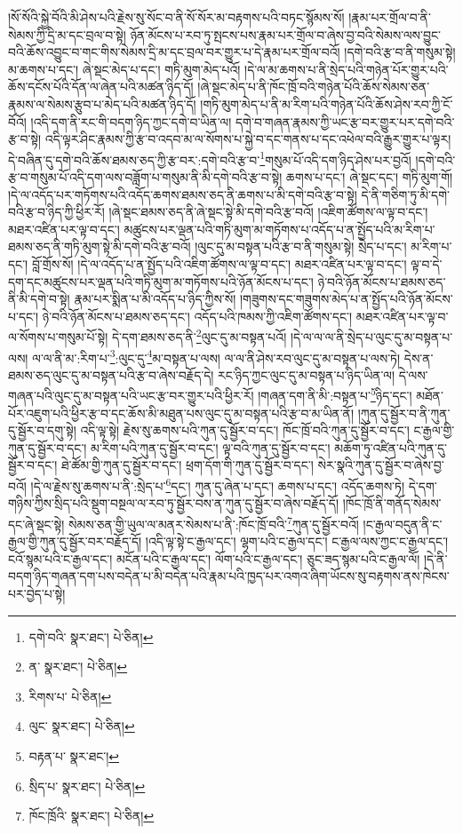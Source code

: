 །སོ་སོའི་སྐྱེ་བོའི་མི་ཤེས་པའི་རྗེས་སུ་སོང་བ་ནི་སོ་སོར་མ་བརྟགས་པའི་བཏང་སྙོམས་སོ། །རྣམ་པར་གྲོལ་བ་ནི་སེམས་ཀྱི་དྲི་མ་དང་བྲལ་བ་སྟེ། ཉོན་མོངས་པ་རབ་ཏུ་སྤངས་པས་རྣམ་པར་གྲོལ་བ་ཞེས་བྱ་བའི་སེམས་ལས་བྱུང་བའི་ཆོས་འབྱུང་བ་གང་གིས་སེམས་དྲི་མ་དང་བྲལ་བར་གྱུར་པ་དེ་རྣམ་པར་གྲོལ་བའོ། །དགེ་བའི་རྩ་བ་ནི་གསུམ་སྟེ། མ་ཆགས་པ་དང་། ཞེ་སྡང་མེད་པ་དང་། གཏི་མུག་མེད་པའོ། །དེ་ལ་མ་ཆགས་པ་ནི་སྲེད་པའི་གཉེན་པོར་གྱུར་པའི་ཆོས་དངོས་པོའི་དོན་ལ་ཞེན་པའི་མཚན་ཉིད་དོ། །ཞེ་སྡང་མེད་པ་ནི་ཁོང་ཁྲོ་བའི་གཉེན་པོའི་ཆོས་སེམས་ཅན་རྣམས་ལ་སེམས་རྩུབ་པ་མེད་པའི་མཚན་ཉིད་དོ། །གཏི་མུག་མེད་པ་ནི་མ་རིག་པའི་གཉེན་པོའི་ཆོས་ཤེས་རབ་ཀྱི་ངོ་བོའོ། །འདི་དག་ནི་རང་གི་བདག་ཉིད་ཀྱང་དགེ་བ་ཡིན་ལ། དགེ་བ་གཞན་རྣམས་ཀྱི་ཡང་རྩ་བར་གྱུར་པར་དགེ་བའི་རྩ་བ་སྟེ། འདི་ལྟར་ཤིང་རྣམས་ཀྱི་རྩ་བ་འདབ་མ་ལ་སོགས་པ་སྐྱེ་བ་དང་གནས་པ་དང་འཕེལ་བའི་རྒྱུར་གྱུར་པ་ལྟར། དེ་བཞིན་དུ་དགེ་བའི་ཆོས་ཐམས་ཅད་ཀྱི་རྩ་བར་:དགེ་བའི་རྩ་བ་\footnote{དགེ་བའི་  སྣར་ཐང་།  པེ་ཅིན། }གསུམ་པོ་འདི་དག་ཉིད་ཤེས་པར་བྱའོ། །དགེ་བའི་རྩ་བ་གསུམ་པོ་འདི་དག་ལས་བཟློག་པ་གསུམ་ནི་མི་དགེ་བའི་རྩ་བ་སྟེ། ཆགས་པ་དང་། ཞེ་སྡང་དང་། གཏི་མུག་གོ། །དེ་ལ་འདོད་པར་གཏོགས་པའི་འདོད་ཆགས་ཐམས་ཅད་ནི་ཆགས་པ་མི་དགེ་བའི་རྩ་བ་སྟེ། དེ་ནི་གཅིག་ཏུ་མི་དགེ་བའི་རྩ་བ་ཉིད་ཀྱི་ཕྱིར་རོ། །ཞེ་སྡང་ཐམས་ཅད་ནི་ཞེ་སྡང་སྟེ་མི་དགེ་བའི་རྩ་བའོ། །འཇིག་ཚོགས་ལ་ལྟ་བ་དང་། མཐར་འཛིན་པར་ལྟ་བ་དང་། མཚུངས་པར་ལྡན་པའི་གཏི་མུག་མ་གཏོགས་པ་འདོད་པ་ན་སྤྱོད་པའི་མ་རིག་པ་ཐམས་ཅད་ནི་གཏི་མུག་སྟེ་མི་དགེ་བའི་རྩ་བའོ། །ལུང་དུ་མ་བསྟན་པའི་རྩ་བ་ནི་གསུམ་སྟེ། སྲེད་པ་དང་། མ་རིག་པ་དང་། བློ་གྲོས་སོ། །དེ་ལ་འདོད་པ་ན་སྤྱོད་པའི་འཇིག་ཚོགས་ལ་ལྟ་བ་དང་། མཐར་འཛིན་པར་ལྟ་བ་དང་། ལྟ་བ་དེ་དག་དང་མཚུངས་པར་ལྡན་པའི་གཏི་མུག་མ་གཏོགས་པའི་ཉོན་མོངས་པ་དང་། ཉེ་བའི་ཉོན་མོངས་པ་ཐམས་ཅད་ནི་མི་དགེ་བ་སྟེ། རྣམ་པར་སྨིན་པ་མི་འདོད་པ་ཉིད་ཀྱིས་སོ། །གཟུགས་དང་གཟུགས་མེད་པ་ན་སྤྱོད་པའི་ཉོན་མོངས་པ་དང་། ཉེ་བའི་ཉོན་མོངས་པ་ཐམས་ཅད་དང་། འདོད་པའི་ཁམས་ཀྱི་འཇིག་ཚོགས་དང་། མཐར་འཛིན་པར་ལྟ་བ་ལ་སོགས་པ་གསུམ་པོ་སྟེ། དེ་དག་ཐམས་ཅད་ནི་\footnote{ན་  སྣར་ཐང་།  པེ་ཅིན། }ལུང་དུ་མ་བསྟན་པའོ། །དེ་ལ་ལ་ལ་ནི་སྲེད་པ་ལུང་དུ་མ་བསྟན་པ་ལས། ལ་ལ་ནི་མ་:རིག་པ་\footnote{རིགས་པ་  པེ་ཅིན། }:ལུང་དུ་\footnote{ལུང་  སྣར་ཐང་།  པེ་ཅིན། }མ་བསྟན་པ་ལས། ལ་ལ་ནི་ཤེས་རབ་ལུང་དུ་མ་བསྟན་པ་ལས་ཏེ། དེས་ན་ཐམས་ཅད་ལུང་དུ་མ་བསྟན་པའི་རྩ་བ་ཞེས་བརྗོད་དེ། རང་ཉིད་ཀྱང་ལུང་དུ་མ་བསྟན་པ་ཉིད་ཡིན་ལ། དེ་ལས་གཞན་པའི་ལུང་དུ་མ་བསྟན་པའི་ཡང་རྩ་བར་གྱུར་པའི་ཕྱིར་རོ། །གཞན་དག་ནི་མི་:བསྟན་པ་\footnote{བརྟན་པ་  སྣར་ཐང་། }ཉིད་དང་། མཐོན་པོར་འཇུག་པའི་ཕྱིར་རྩ་བ་དང་ཆོས་མི་མཐུན་པས་ལུང་དུ་མ་བསྟན་པའི་རྩ་བ་མ་ཡིན་ནོ། །ཀུན་དུ་སྦྱོར་བ་ནི་ཀུན་དུ་སྦྱོར་བ་དགུ་སྟེ། འདི་ལྟ་སྟེ། རྗེས་སུ་ཆགས་པའི་ཀུན་དུ་སྦྱོར་བ་དང་། ཁོང་ཁྲོ་བའི་ཀུན་དུ་སྦྱོར་བ་དང་། ང་རྒྱལ་གྱི་ཀུན་དུ་སྦྱོར་བ་དང་། མ་རིག་པའི་ཀུན་དུ་སྦྱོར་བ་དང་། ལྟ་བའི་ཀུན་དུ་སྦྱོར་བ་དང་། མཆོག་ཏུ་འཛིན་པའི་ཀུན་དུ་སྦྱོར་བ་དང་། ཐེ་ཚོམ་གྱི་ཀུན་དུ་སྦྱོར་བ་དང་། ཕྲག་དོག་གི་ཀུན་དུ་སྦྱོར་བ་དང་། སེར་སྣའི་ཀུན་དུ་སྦྱོར་བ་ཞེས་བྱ་བའོ། །དེ་ལ་རྗེས་སུ་ཆགས་པ་ནི་:སྲེད་པ་\footnote{སྲིད་པ་  སྣར་ཐང་།  པེ་ཅིན། }དང་། ཀུན་དུ་ཞེན་པ་དང་། ཆགས་པ་དང་། འདོད་ཆགས་ཏེ། དེ་དག་གཉིས་ཀྱིས་སྲིད་པའི་སྡུག་བསྔལ་ལ་རབ་ཏུ་སྦྱོར་བས་ན་ཀུན་དུ་སྦྱོར་བ་ཞེས་བརྗོད་དོ། །ཁོང་ཁྲོ་ནི་གནོད་སེམས་དང་ཞེ་སྡང་སྟེ། སེམས་ཅན་གྱི་ཡུལ་ལ་མནར་སེམས་པ་ནི་:ཁོང་ཁྲོ་བའི་\footnote{ཁོང་ཁྲོའི་  སྣར་ཐང་།  པེ་ཅིན། }ཀུན་དུ་སྦྱོར་བའོ། །ང་རྒྱལ་བདུན་ནི་ང་རྒྱལ་གྱི་ཀུན་དུ་སྦྱོར་བར་བརྗོད་དོ། །འདི་ལྟ་སྟེ་ང་རྒྱལ་དང་། ལྷག་པའི་ང་རྒྱལ་དང་། ང་རྒྱལ་ལས་ཀྱང་ང་རྒྱལ་དང་། ངའོ་སྙམ་པའི་ང་རྒྱལ་དང་། མངོན་པའི་ང་རྒྱལ་དང་། ལོག་པའི་ང་རྒྱལ་དང་། ཅུང་ཟད་སྙམ་པའི་ང་རྒྱལ་ལོ། །དེ་ནི་བདག་ཉིད་གཞན་དག་པས་བདེན་པ་མི་བདེན་པའི་རྣམ་པའི་ཁྱད་པར་འགའ་ཞིག་ཡོངས་སུ་བརྟགས་ནས་ཁེངས་པར་བྱེད་པ་སྟེ། 